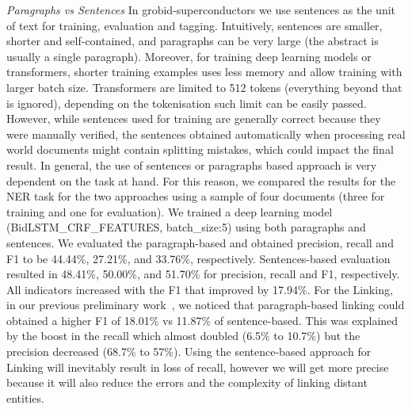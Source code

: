 \documentclass{article}
\begin{document}
\emph{Paragraphs vs Sentences}
In grobid-superconductors we use sentences as the unit of text for training, evaluation and tagging.  
Intuitively, sentences are smaller, shorter and self-contained, and paragraphs can be very large (the abstract is usually a single paragraph). 
Moreover, for training deep learning models or transformers, shorter training examples uses less memory and allow training with larger batch size. 
Transformers are limited to 512 tokens (everything beyond that is ignored), depending on the tokenisation such limit can be easily passed. 
However, while sentences used for training are generally correct because they were manually verified, the sentences obtained automatically when processing real world documents might contain splitting mistakes, which could impact the final result. 
In general, the use of sentences or paragraphs based approach is very dependent on the task at hand. 
For this reason, we compared the results for the NER task for the two approaches using a sample of four documents (three for training and one for evaluation). We trained a deep learning model (BidLSTM\_CRF\_FEATURES, batch\_size:5) using both paragraphs and sentences. 
We evaluated the paragraph-based and obtained precision, recall and F1 to be 44.44\%, 27.21\%, and 33.76\%, respectively. Sentences-based evaluation resulted in 48.41\%, 50.00\%, and 51.70\% for precision, recall and F1, respectively. 
All indicators increased with the F1 that improved by 17.94\%.
For the Linking, in our previous preliminary work~\cite{foppiano2019proposal}, we noticed that paragraph-based linking could obtained a higher F1 of 18.01\% vs 11.87\% of sentence-based. 
This was explained by the boost in the recall which almost doubled (6.5\% to 10.7\%) but the precision decreased (68.7\% to 57\%). 
Using the sentence-based approach for Linking will inevitably result in loss of recall, however we will get more precise because it will also reduce the errors and the complexity of linking distant entities. 


\end{document}
